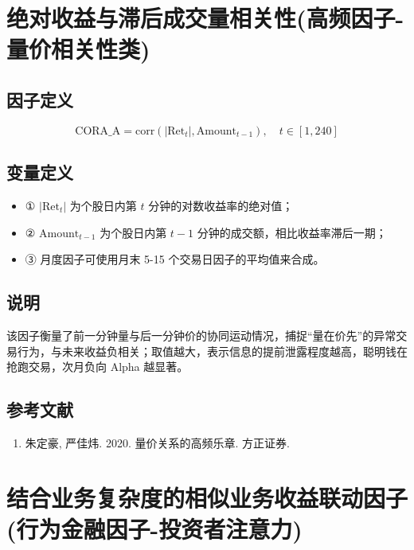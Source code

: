\documentclass{article}
\begin{document}
\section{绝对收益与滞后成交量相关性(高频因子-量价相关性类)}

\subsection{因子定义}
\begin{equation}
    \mathrm{CORA\_A} = \mathrm{corr}(|\mathrm{Ret}_t|, \mathrm{Amount}_{t-1}), \quad t \in [1, 240]
\end{equation}

\subsection{变量定义}
\begin{itemize}
    \item ① \( |\mathrm{Ret}_t| \) 为个股日内第 \( t \) 分钟的对数收益率的绝对值；
    \item ② \( \mathrm{Amount}_{t-1} \) 为个股日内第 \( t-1 \) 分钟的成交额，相比收益率滞后一期；
    \item ③ 月度因子可使用月末 5-15 个交易日因子的平均值来合成。
\end{itemize}

\subsection{说明}
该因子衡量了前一分钟量与后一分钟价的协同运动情况，捕捉“量在价先”的异常交易行为，与未来收益负相关；取值越大，表示信息的提前泄露程度越高，聪明钱在抢跑交易，次月负向 Alpha 越显著。

\subsection{参考文献}
\begin{enumerate}
    \item 朱定豪, 严佳炜. 2020. 量价关系的高频乐章. 方正证券.
\end{enumerate}

\section{结合业务复杂度的相似业务收益联动因子(行为金融因子-投资者注意力)}
\end{document}
